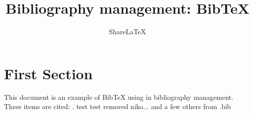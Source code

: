 \documentclass[a4paper,10pt]{article}
\title{Bibliography management: BibTeX}
\author{Share\LaTeX}
\begin{document}
\maketitle

\tableofcontents

\medskip

\section{First Section}
This document is an example of BibTeX using in bibliography management. Three items are cited: \cite{patchkovskii_2017}. 
test test removed niko... and a few others from .bib
\medskip



\end{document}
